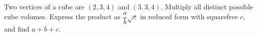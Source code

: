 Two vertices of a cube are $(2,3,4)$ and $(3,3,4)$. Multiply all distinct possible cube volumes. Express the product as $\dfrac{a}{b}\sqrt c$ in reduced form with squarefree $c$, and find $a+b+c$.
